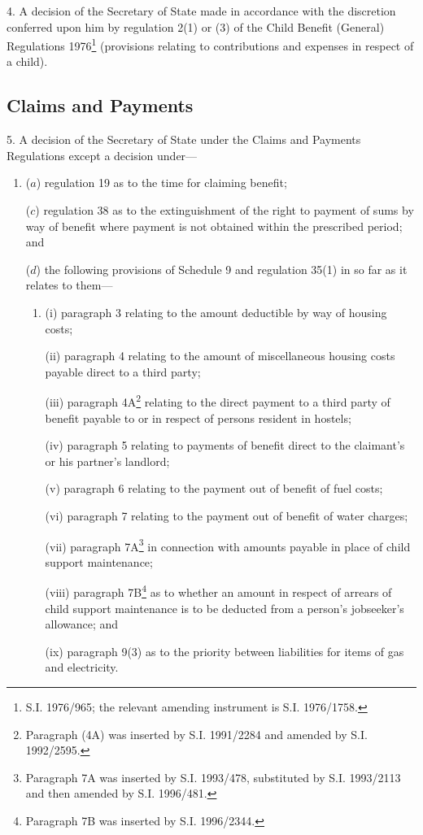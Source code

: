 \documentclass[12pt,a4paper]{article}
\begin{document}
\medskip

4.  A decision of the Secretary of State made in accordance with the discretion conferred upon him by regulation 2(1) or (3) of the Child Benefit (General) Regulations 1976\footnote{\frenchspacing S.I. 1976/965; the relevant amending instrument is S.I. 1976/1758.} (provisions relating to contributions and expenses in respect of a child).

\subsection*{Claims and Payments}

5.  A decision of the Secretary of State under the Claims and Payments Regulations except a decision under—
\begin{enumerate}\item[]
($a$) regulation 19 as to the time for claiming benefit;


($c$) regulation 38 as to the extinguishment of the right to payment of sums by way of benefit where payment is not obtained within the prescribed period; and

($d$) the following provisions of Schedule 9 and regulation 35(1) in so far as it relates to them—
\begin{enumerate}\item[]
(i) paragraph 3 relating to the amount deductible by way of housing costs;

(ii) paragraph 4 relating to the amount of miscellaneous housing costs payable direct to a third party;

(iii) paragraph 4A\footnote{\frenchspacing Paragraph (4A) was inserted by S.I. 1991/2284 and amended by S.I. 1992/2595.} relating to the direct payment to a third party of benefit payable to or in respect of persons resident in hostels;

(iv) paragraph 5 relating to payments of benefit direct to the claimant’s or his partner’s landlord;

(v) paragraph 6 relating to the payment out of benefit of fuel costs;

(vi) paragraph 7 relating to the payment out of benefit of water charges;

(vii) paragraph 7A\footnote{\frenchspacing Paragraph 7A was inserted by S.I. 1993/478, substituted by S.I. 1993/2113 and then amended by S.I. 1996/481.} in connection with amounts payable in place of child support maintenance;

(viii) paragraph 7B\footnote{\frenchspacing Paragraph 7B was inserted by S.I. 1996/2344.} as to whether an amount in respect of arrears of child support maintenance is to be deducted from a person’s jobseeker’s allowance; and

(ix) paragraph 9(3) as to the priority between liabilities for items of gas and electricity.
\end{enumerate}
\end{enumerate}
\end{document}

